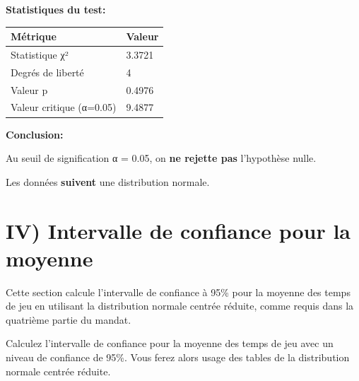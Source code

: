\textbf{Statistiques du test:}

\begin{longtable}[]{@{}ll@{}}
\toprule\noalign{}
Métrique & Valeur \\
\midrule\noalign{}
\endhead
\bottomrule\noalign{}
\endlastfoot
Statistique χ² & 3.3721 \\
Degrés de liberté & 4 \\
Valeur p & 0.4976 \\
Valeur critique (α=0.05) & 9.4877 \\
\end{longtable}

\textbf{Conclusion:}

Au seuil de signification α = 0.05, on \textbf{ne rejette pas}
l'hypothèse nulle.

Les données \textbf{suivent} une distribution normale.



    \section{IV) Intervalle de confiance pour la
moyenne}\label{iv-intervalle-de-confiance-pour-la-moyenne}

Cette section calcule l'intervalle de confiance à 95\% pour la moyenne
des temps de jeu en utilisant la distribution normale centrée réduite,
comme requis dans la quatrième partie du mandat.

Calculez l'intervalle de confiance pour la moyenne des temps de jeu avec
un niveau de confiance de 95\%. Vous ferez alors usage des tables de la
distribution normale centrée réduite.

